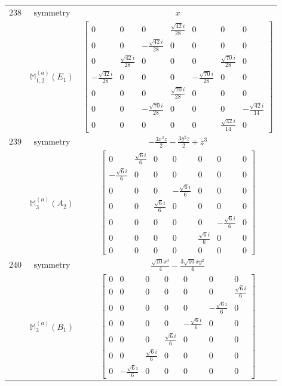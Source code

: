 \documentclass[fleqn,8pt,landscape]{jsarticle}
\begin{document}
\begin{longtable}{ccc}
$ 238 $ & $ \text{symmetry} $ & $ x $ \\
$  $ & $ \mathbb{M}_{1,2}^{(a)}(E_{1}) $ & $ \begin{bmatrix} 0 & 0 & 0 & \frac{\sqrt{42} i}{28} & 0 & 0 & 0 \\ 0 & 0 & - \frac{\sqrt{42} i}{28} & 0 & 0 & 0 & 0 \\ 0 & \frac{\sqrt{42} i}{28} & 0 & 0 & 0 & \frac{\sqrt{70} i}{28} & 0 \\ - \frac{\sqrt{42} i}{28} & 0 & 0 & 0 & - \frac{\sqrt{70} i}{28} & 0 & 0 \\ 0 & 0 & 0 & \frac{\sqrt{70} i}{28} & 0 & 0 & 0 \\ 0 & 0 & - \frac{\sqrt{70} i}{28} & 0 & 0 & 0 & - \frac{\sqrt{42} i}{14} \\ 0 & 0 & 0 & 0 & 0 & \frac{\sqrt{42} i}{14} & 0 \end{bmatrix} $ \\ \hline
$ 239 $ & $ \text{symmetry} $ & $ - \frac{3 x^{2} z}{2} - \frac{3 y^{2} z}{2} + z^{3} $ \\
$  $ & $ \mathbb{M}_{3}^{(a)}(A_{2}) $ & $ \begin{bmatrix} 0 & \frac{\sqrt{6} i}{6} & 0 & 0 & 0 & 0 & 0 \\ - \frac{\sqrt{6} i}{6} & 0 & 0 & 0 & 0 & 0 & 0 \\ 0 & 0 & 0 & - \frac{\sqrt{6} i}{6} & 0 & 0 & 0 \\ 0 & 0 & \frac{\sqrt{6} i}{6} & 0 & 0 & 0 & 0 \\ 0 & 0 & 0 & 0 & 0 & - \frac{\sqrt{6} i}{6} & 0 \\ 0 & 0 & 0 & 0 & \frac{\sqrt{6} i}{6} & 0 & 0 \\ 0 & 0 & 0 & 0 & 0 & 0 & 0 \end{bmatrix} $ \\ \hline
$ 240 $ & $ \text{symmetry} $ & $ \frac{\sqrt{10} x^{3}}{4} - \frac{3 \sqrt{10} x y^{2}}{4} $ \\
$  $ & $ \mathbb{M}_{3}^{(a)}(B_{1}) $ & $ \begin{bmatrix} 0 & 0 & 0 & 0 & 0 & 0 & 0 \\ 0 & 0 & 0 & 0 & 0 & 0 & \frac{\sqrt{6} i}{6} \\ 0 & 0 & 0 & 0 & 0 & - \frac{\sqrt{6} i}{6} & 0 \\ 0 & 0 & 0 & 0 & - \frac{\sqrt{6} i}{6} & 0 & 0 \\ 0 & 0 & 0 & \frac{\sqrt{6} i}{6} & 0 & 0 & 0 \\ 0 & 0 & \frac{\sqrt{6} i}{6} & 0 & 0 & 0 & 0 \\ 0 & - \frac{\sqrt{6} i}{6} & 0 & 0 & 0 & 0 & 0 \end{bmatrix} $ \\ \hline

\end{longtable}
\end{document}

